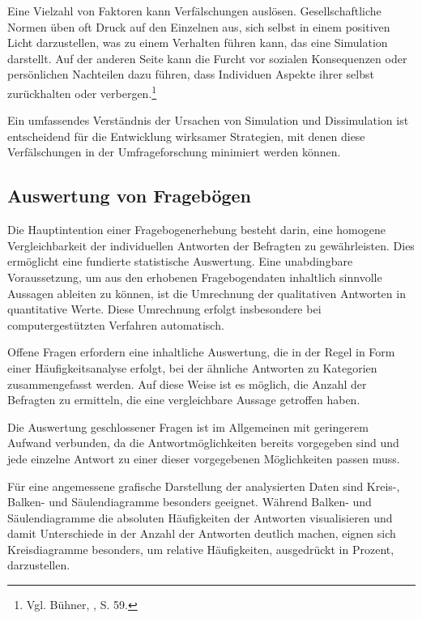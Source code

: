 Eine Vielzahl von Faktoren kann Verfälschungen auslösen. Gesellschaftliche Normen üben oft Druck auf den Einzelnen aus,
sich selbst in einem positiven Licht darzustellen, was zu einem Verhalten führen kann, das eine Simulation darstellt. Auf
der anderen Seite kann die Furcht vor sozialen Konsequenzen oder persönlichen Nachteilen dazu führen, dass Individuen
Aspekte ihrer selbst zurückhalten oder verbergen.\footnote{Vgl. Bühner, \cite{Einfuehrung in die TEst und Fragebogenkonstruktion}, S. 59.}

Ein umfassendes Verständnis der Ursachen von Simulation und Dissimulation ist entscheidend für die Entwicklung wirksamer
Strategien, mit denen diese Verfälschungen in der Umfrageforschung minimiert werden können.

\subsection{Auswertung von Fragebögen}
Die Hauptintention einer Fragebogenerhebung besteht darin, eine homogene Vergleichbarkeit der individuellen Antworten der
Befragten zu gewährleisten. Dies ermöglicht eine fundierte statistische Auswertung. Eine unabdingbare Voraussetzung, um
aus den erhobenen Fragebogendaten inhaltlich sinnvolle Aussagen ableiten zu können, ist die Umrechnung der qualitativen
Antworten in quantitative Werte. Diese Umrechnung erfolgt insbesondere bei computergestützten Verfahren automatisch.

Offene Fragen erfordern eine inhaltliche Auswertung, die in der Regel in Form einer Häufigkeitsanalyse erfolgt, bei der
ähnliche Antworten zu Kategorien zusammengefasst werden. Auf diese Weise ist es möglich, die Anzahl der Befragten zu
ermitteln, die eine vergleichbare Aussage getroffen haben.

Die Auswertung geschlossener Fragen ist im Allgemeinen mit geringerem Aufwand verbunden, da die Antwortmöglichkeiten
bereits vorgegeben sind und jede einzelne Antwort zu einer dieser vorgegebenen Möglichkeiten passen muss.

Für eine angemessene grafische Darstellung der analysierten Daten sind Kreis-, Balken- und Säulendiagramme besonders
geeignet. Während Balken- und Säulendiagramme die absoluten Häufigkeiten der Antworten visualisieren und damit Unterschiede
in der Anzahl der Antworten deutlich machen, eignen sich Kreisdiagramme besonders, um relative Häufigkeiten, ausgedrückt
in Prozent, darzustellen.